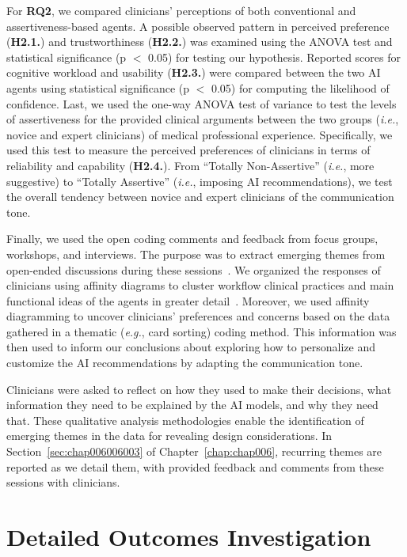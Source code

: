 For {\bf RQ2}, we compared clinicians' perceptions of both conventional and assertiveness-based agents.
A possible observed pattern in perceived preference ({\bf H2.1.}) and trustworthiness ({\bf H2.2.}) was examined using the \ac{ANOVA} test and statistical significance (p $<$ 0.05) for testing our hypothesis.
Reported scores for cognitive workload and usability ({\bf H2.3.}) were compared between the two AI agents using statistical significance (p $<$ 0.05) for computing the likelihood of confidence.
Last, we used the one-way \ac{ANOVA} test of variance to test the levels of assertiveness for the provided clinical arguments between the two groups ({\it i.e.}, novice and expert clinicians) of medical professional experience.
Specifically, we used this test to measure the perceived preferences of clinicians in terms of reliability and capability ({\bf H2.4.}).
From ``Totally Non-Assertive'' ({\it i.e.}, more suggestive) to ``Totally Assertive'' ({\it i.e.}, imposing \ac{AI} recommendations), we test the overall tendency between novice and expert clinicians of the communication tone.

Finally, we used the open coding comments and feedback from focus groups, workshops, and interviews.
The purpose was to extract emerging themes from open-ended discussions during these sessions~\cite{SHIBUYA2022107131, BIEG2022107249}.
We organized the responses of clinicians using affinity diagrams to cluster workflow clinical practices and main functional ideas of the agents in greater detail~\cite{DEUTSCH2019122, 10.1145/3491101.3519863}.
Moreover, we used affinity diagramming to uncover clinicians' preferences and concerns based on the data gathered in a thematic ({\it e.g.}, card sorting) coding method.
This information was then used to inform our conclusions about exploring how to personalize and customize the AI recommendations by adapting the communication tone.

Clinicians were asked to reflect on how they used to make their decisions, what information they need to be explained by the AI models, and why they need that.
These qualitative analysis methodologies enable the identification of emerging themes in the data for revealing design considerations.
In Section~\ref{sec:chap006006003} of Chapter~\ref{chap:chap006}, recurring themes are reported as we detail them, with provided feedback and comments from these sessions with clinicians.

\section{Detailed Outcomes Investigation}
\label{sec:app005007}

